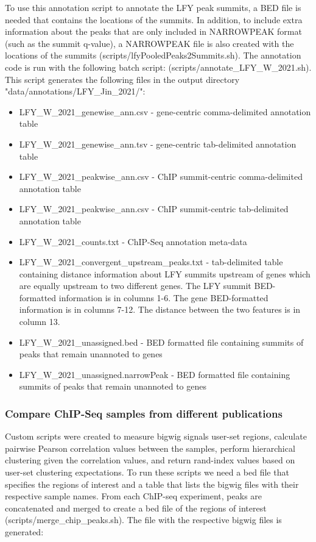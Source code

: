 \documentclass{article}
\begin{document}
\begin{sloppypar}
To use this annotation script to annotate the LFY peak summits, a BED file is needed that contains the locations of the summits. In addition, to include extra information about the peaks that are only included in NARROWPEAK format (such as the summit q-value), a NARROWPEAK file is also created with the locations of the summits ({\selectfont scripts/lfyPooledPeaks2Summits.sh}). The annotation code is run with the following batch script: (scripts/annotate\_LFY\_W\_2021.sh). This script generates the following files in the output directory "data/annotations/LFY\_Jin\_2021/":
\begin{itemize}
\item LFY\_W\_2021\_genewise\_ann.csv - gene-centric comma-delimited annotation table
\item LFY\_W\_2021\_genewise\_ann.tsv - gene-centric tab-delimited annotation table
\item LFY\_W\_2021\_peakwise\_ann.csv - ChIP summit-centric comma-delimited annotation table
\item LFY\_W\_2021\_peakwise\_ann.csv - ChIP summit-centric tab-delimited annotation table
\item  LFY\_W\_2021\_counts.txt - ChIP-Seq annotation meta-data
\item  LFY\_W\_2021\_convergent\_upstream\_peaks.txt - tab-delimited table containing distance information about LFY summits upstream of genes which are equally upstream to two different genes. The LFY summit BED-formatted information is in columns 1-6. The gene BED-formatted information is in columns 7-12. The distance between the two features is in column 13. 
\item  LFY\_W\_2021\_unassigned.bed - BED formatted file containing summits of peaks that remain unannoted to genes
\item  LFY\_W\_2021\_unassigned.narrowPeak - BED formatted file containing summits of peaks that remain unannoted to genes

\end{itemize}


\subsubsection{Compare ChIP-Seq samples from different publications}
Custom scripts were created to measure bigwig signals user-set regions, calculate pairwise Pearson correlation values between the samples, perform hierarchical clustering given the correlation values, and return rand-index values based on user-set clustering expectations. To run these scripts we need a bed file that specifies the regions of interest and a table that lists the bigwig files with their respective sample names. From each ChIP-seq experiment, peaks are concatenated and merged to create a bed file of the regions of interest ({\selectfont scripts/merge\_chip\_peaks.sh}). The file with the respective bigwig files is generated:


\end{sloppypar}
\end{document}
